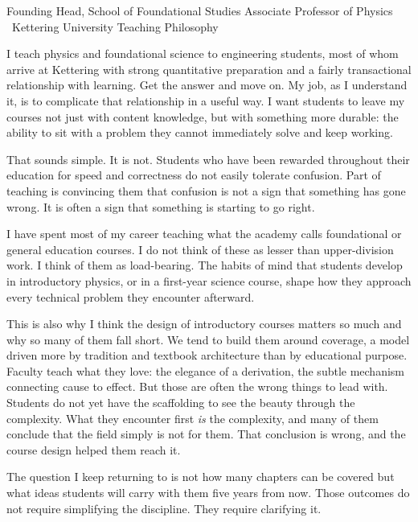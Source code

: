 \documentclass[10pt]{article}
\begin{document}
\statementheader
  {Founding Head, School of Foundational Studies}
  {Associate Professor of Physics \textperiodcentered\ Kettering University}
  {Teaching Philosophy}



I teach physics and foundational science to engineering students, most of whom arrive at
Kettering with strong quantitative preparation and a fairly transactional relationship with
learning. Get the answer and move on. My job, as I understand it, is to complicate that
relationship in a useful way. I want students to leave my courses not just with content
knowledge, but with something more durable: the ability to sit with a problem they cannot
immediately solve and keep working.

That sounds simple. It is not. Students who have been rewarded throughout their education
for speed and correctness do not easily tolerate confusion. Part of teaching is convincing
them that confusion is not a sign that something has gone wrong. It is often a sign that
something is starting to go right.


I have spent most of my career teaching what the academy calls foundational or general
education courses. I do not think of these as lesser than upper-division work. I think of
them as load-bearing. The habits of mind that students develop in introductory physics, or
in a first-year science course, shape how they approach every technical problem they
encounter afterward.

This is also why I think the design of introductory courses matters so much and why so many
of them fall short. We tend to build them around coverage, a model driven more by tradition
and textbook architecture than by educational purpose. Faculty teach what they love: the
elegance of a derivation, the subtle mechanism connecting cause to effect. But those are
often the wrong things to lead with. Students do not yet have the scaffolding to see the
beauty through the complexity. What they encounter first \textit{is} the complexity, and many
of them conclude that the field simply is not for them. That conclusion is wrong, and the
course design helped them reach it.

The question I keep returning to is not how many chapters can be covered but what ideas
students will carry with them five years from now. Those outcomes do not require simplifying
the discipline. They require clarifying it.
\end{document}
